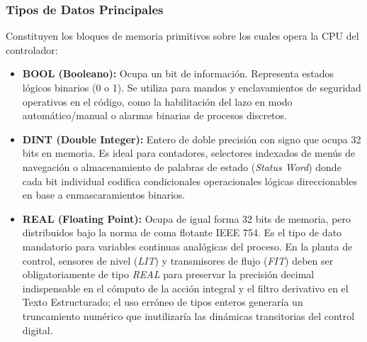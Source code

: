 \subsubsection{Tipos de Datos Principales }
Constituyen los bloques de memoria primitivos sobre los cuales opera la CPU del controlador:
\begin{itemize}
    \item \textbf{BOOL (Booleano):} Ocupa un bit de información. Representa estados lógicos binarios (0 o 1). Se utiliza para mandos y enclavamientos de seguridad operativos en el código, como la habilitación del lazo en modo automático/manual o alarmas binarias de procesos discretos.
    \item \textbf{DINT (Double Integer):} Entero de doble precisión con signo que ocupa 32 bits en memoria. Es ideal para contadores, selectores indexados de menús de navegación o almacenamiento de palabras de estado (\textit{Status Word}) donde cada bit individual codifica condicionales operacionales lógicas direccionables en base a enmascaramientos binarios.
    \item \textbf{REAL (Floating Point):} Ocupa de igual forma 32 bits de memoria, pero distribuidos bajo la norma de coma flotante IEEE 754. Es el tipo de dato mandatorio para variables continuas analógicas del proceso. En la planta de control, sensores de nivel (\textit{LIT}) y transmisores de flujo (\textit{FIT}) deben ser obligatoriamente de tipo \textit{REAL} para preservar la precisión decimal indispensable en el cómputo de la acción integral y el filtro derivativo en el Texto Estructurado; el uso erróneo de tipos enteros generaría un truncamiento numérico que inutilizaría las dinámicas transitorias del control digital.
\end{itemize}


